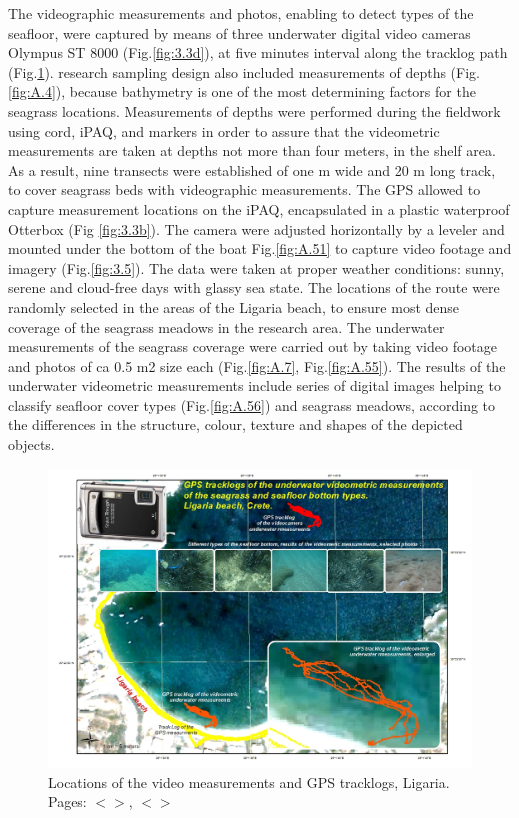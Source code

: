 \documentclass[11pt]{article}
\begin{document}
The videographic measurements and photos, enabling to detect types of the
seafloor, were captured by means of three underwater digital video cameras \ac{Olympus ST} 8000  (Fig.\ref{fig:3.3d})\label{page-26}, at
five minutes interval along the tracklog path (Fig.\ref{fig:3.6}).
research sampling design also included measurements of depths (Fig. \ref{fig:A.4}), because bathymetry is one of the
most determining factors for the seagrass locations. Measurements of depths were performed during
the fieldwork using cord, \ac{iPAQ}, and markers in order to assure that the videometric measurements
are taken at depths not more than four meters, in the shelf area.
As a result, nine transects were established of one m wide and 20 m long track, to cover seagrass beds
with videographic measurements. The \ac{GPS} allowed to capture measurement locations on the \ac{iPAQ},
encapsulated in a plastic waterproof Otterbox (Fig \ref{fig:3.3b}). The camera were adjusted horizontally by a leveler and
mounted under the bottom of the boat Fig.\ref{fig:A.51}\label{page-27} to capture video footage and imagery (Fig.\ref{fig:3.5}). The data
were taken at proper weather conditions: sunny, serene and cloud-free days with glassy sea state. 
The locations of the route were randomly selected in the areas of the Ligaria beach, to ensure most dense
coverage of the seagrass meadows in the research area. The underwater measurements of the seagrass
coverage were carried out by taking video footage and photos of ca 0.5 m2 size each (Fig.\ref{fig:A.7}, Fig.\ref{fig:A.55}).
The results of the underwater videometric measurements include series of digital images helping to
classify seafloor cover types (Fig.\ref{fig:A.56}) and seagrass meadows, according to the differences in the structure,
colour, texture and shapes of the depicted objects\label{page-27}.

\begin{figure}[H]
	\centering
	\includegraphics[scale=0.50]{Fig-21.jpg}
	\caption{Locations of the video measurements and GPS tracklogs, Ligaria. Pages: $<$\pageref{page-25}$>$, $<$\pageref{page-26}$>$}
	\label{fig:3.6}
\end{figure}
\end{document}
